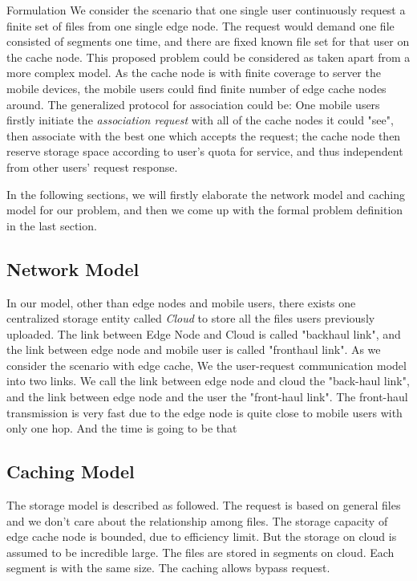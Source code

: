 \documentclass{article}
\begin{document}
\begin{section}{Formulation}
    \label{formulation}
    We consider the scenario that one single user continuously request a finite set of files from one single edge node. The request would demand one file consisted of segments one time, and there are fixed known file set for that user on the cache node.
    This proposed problem could be considered as taken apart from a more complex model. As the cache node is with finite coverage to server the mobile devices, the mobile users could find finite number of edge cache nodes around. The generalized protocol for association could be: One mobile users firstly initiate the \textit{association request} with all of the cache nodes it could "see", then associate with the best one which accepts the request; the cache node then reserve storage space according to user's quota for service, and thus independent from other users' request response.
    
    In the following sections, we will firstly elaborate the network model and caching model for our problem, and then we come up with the formal problem definition in the last section.

    \subsection{Network Model}
    In our model, other than edge nodes and mobile users, there exists one centralized storage entity called \emph{Cloud} to store all the files users previously uploaded.
    The link between Edge Node and Cloud is called "backhaul link", and the link between edge node and mobile user is called "fronthaul link".
    As we consider the scenario with edge cache, 
    We the user-request communication model into two links. We call the link between edge node and cloud the "back-haul link", and the link between edge node and the user the "front-haul link".
    The front-haul transmission is very fast due to the edge node is quite close to mobile users with only one hop. And the time is going to be that 
    
    \subsection{Caching Model}
    The storage model is described as followed. The request is based on general files and we don't care about the relationship among files.
    The storage capacity of edge cache node is bounded, due to efficiency limit. But the storage on cloud is assumed to be incredible large. The files are stored in segments on cloud. Each segment is with the same size.
    The caching allows bypass request.


\end{section}
\end{document}
